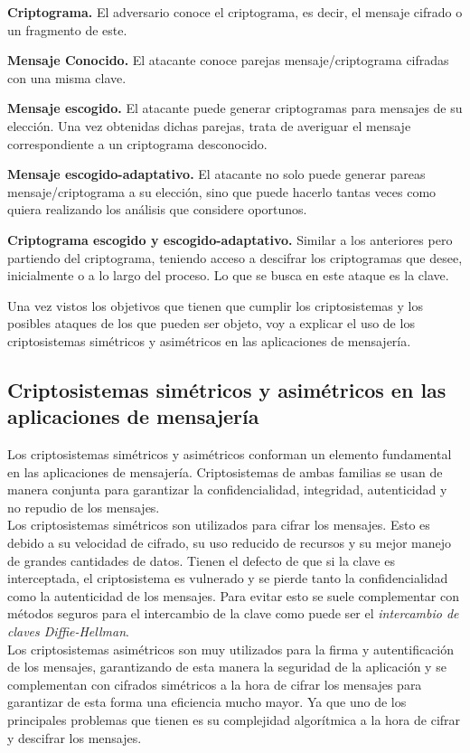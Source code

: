 \begin{description}
		\item \textbf{Criptograma.} El adversario conoce el criptograma, es decir, el mensaje cifrado o un fragmento de este.
		\item \textbf{Mensaje Conocido.} El atacante conoce parejas mensaje/criptograma cifradas con una misma clave.
		\item \textbf{Mensaje escogido.} El atacante puede generar criptogramas para mensajes de su elección. Una vez obtenidas dichas parejas, trata de averiguar el mensaje correspondiente a un criptograma desconocido.
		\item \textbf{Mensaje escogido-adaptativo.} El atacante no solo puede generar pareas mensaje/criptograma a su elección, sino que puede hacerlo tantas veces como quiera realizando los análisis que considere oportunos.
		\item \textbf{Criptograma escogido y escogido-adaptativo.} Similar a los anteriores pero partiendo del criptograma, teniendo acceso a descifrar los criptogramas que desee, inicialmente o a lo largo del proceso. Lo que se busca en este ataque es la clave.
\end{description}

Una vez vistos los objetivos que tienen que cumplir los criptosistemas y los posibles ataques de los que pueden ser objeto, voy a explicar el uso de los criptosistemas simétricos y asimétricos en las aplicaciones de mensajería.\\

\subsection{Criptosistemas simétricos y asimétricos en las aplicaciones de mensajería}
Los criptosistemas simétricos y asimétricos conforman un elemento fundamental en las aplicaciones de mensajería. Criptosistemas de ambas familias se usan de manera conjunta para garantizar la confidencialidad, integridad, autenticidad y no repudio de los mensajes.\\
Los criptosistemas simétricos son utilizados para cifrar los mensajes. Esto es debido a su velocidad de cifrado, su uso reducido de recursos y su mejor manejo de grandes cantidades de datos.
Tienen el defecto de que si la clave es interceptada, el criptosistema es vulnerado y se pierde tanto la confidencialidad como la autenticidad de los mensajes. 
Para evitar esto se suele complementar con métodos seguros para el intercambio de la clave como puede ser el \emph{intercambio de claves Diffie-Hellman}.\\
Los criptosistemas asimétricos son muy utilizados para la firma y autentificación de los mensajes, garantizando de esta manera la seguridad de la aplicación y se complementan con cifrados simétricos a la hora de cifrar los mensajes para garantizar de esta forma una eficiencia mucho mayor. Ya que uno de los principales problemas que tienen es su complejidad algorítmica a la hora de cifrar y descifrar los mensajes.\\

